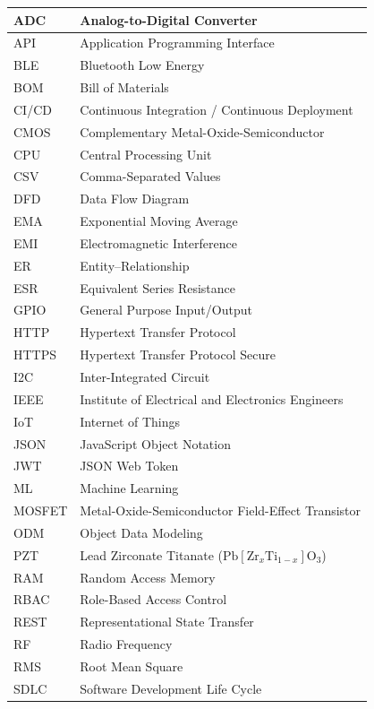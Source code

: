 \begin{center}
\begin{longtable}{|p{1.4in}|p{4.1in}|}
ADC & Analog-to-Digital Converter\\ \hline
API & Application Programming Interface\\ \hline
BLE & Bluetooth Low Energy\\ \hline
BOM & Bill of Materials\\ \hline
CI/CD & Continuous Integration / Continuous Deployment\\ \hline
CMOS & Complementary Metal-Oxide-Semiconductor\\ \hline
CPU & Central Processing Unit\\ \hline
CSV & Comma-Separated Values\\ \hline
DFD & Data Flow Diagram\\ \hline
EMA & Exponential Moving Average\\ \hline
EMI & Electromagnetic Interference\\ \hline
ER & Entity--Relationship\\ \hline
ESR & Equivalent Series Resistance\\ \hline
GPIO & General Purpose Input/Output\\ \hline
HTTP & Hypertext Transfer Protocol\\ \hline
HTTPS & Hypertext Transfer Protocol Secure\\ \hline
I2C & Inter-Integrated Circuit\\ \hline
IEEE & Institute of Electrical and Electronics Engineers\\ \hline
IoT & Internet of Things\\ \hline
JSON & JavaScript Object Notation\\ \hline
JWT & JSON Web Token\\ \hline
ML & Machine Learning\\ \hline
MOSFET & Metal-Oxide-Semiconductor Field-Effect Transistor\\ \hline
ODM & Object Data Modeling\\ \hline
PZT & Lead Zirconate Titanate ($\text{Pb}[\text{Zr}_x\text{Ti}_{1-x}]\text{O}_3$)\\ \hline
RAM & Random Access Memory\\ \hline
RBAC & Role-Based Access Control\\ \hline
REST & Representational State Transfer\\ \hline
RF & Radio Frequency\\ \hline
RMS & Root Mean Square\\ \hline
SDLC & Software Development Life Cycle\\ \hline

\end{longtable}
\end{center}
